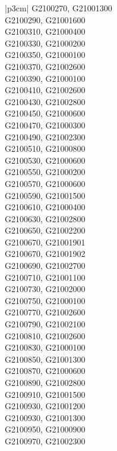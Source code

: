 \begin{customLongTable}{ |p{3cm}| }
G2100270, G21001300 \\ \hline
G2100290, G21001600 \\ \hline
G2100310, G21000400 \\ \hline
G2100330, G21000200 \\ \hline
G2100350, G21000100 \\ \hline
G2100370, G21002600 \\ \hline
G2100390, G21000100 \\ \hline
G2100410, G21002600 \\ \hline
G2100430, G21002800 \\ \hline
G2100450, G21000600 \\ \hline
G2100470, G21000300 \\ \hline
G2100490, G21002300 \\ \hline
G2100510, G21000800 \\ \hline
G2100530, G21000600 \\ \hline
G2100550, G21000200 \\ \hline
G2100570, G21000600 \\ \hline
G2100590, G21001500 \\ \hline
G2100610, G21000400 \\ \hline
G2100630, G21002800 \\ \hline
G2100650, G21002200 \\ \hline
G2100670, G21001901 \\ \hline
G2100670, G21001902 \\ \hline
G2100690, G21002700 \\ \hline
G2100710, G21001100 \\ \hline
G2100730, G21002000 \\ \hline
G2100750, G21000100 \\ \hline
G2100770, G21002600 \\ \hline
G2100790, G21002100 \\ \hline
G2100810, G21002600 \\ \hline
G2100830, G21000100 \\ \hline
G2100850, G21001300 \\ \hline
G2100870, G21000600 \\ \hline
G2100890, G21002800 \\ \hline
G2100910, G21001500 \\ \hline
G2100930, G21001200 \\ \hline
G2100930, G21001300 \\ \hline
G2100950, G21000900 \\ \hline
G2100970, G21002300 \\ \hline

\end{customLongTable}

